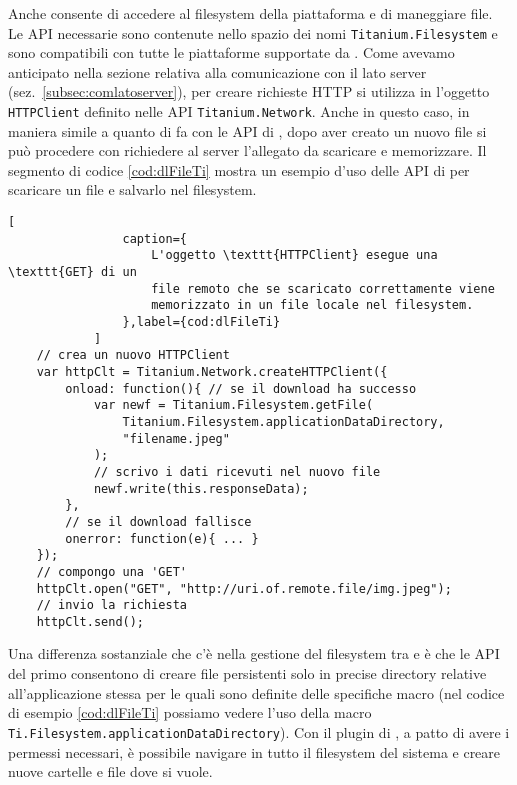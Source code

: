             Anche \tisdk{} consente di accedere al filesystem della piattaforma
            e di maneggiare file. Le API necessarie sono contenute nello
            spazio dei nomi \texttt{Titanium.Filesystem} e sono compatibili
            con tutte le piattaforme supportate da \tisdk{}. Come avevamo
            anticipato nella sezione relativa alla comunicazione con il lato
            server (sez.~\ref{subsec:comlatoserver}), per creare richieste HTTP
            si utilizza in \tisdk{} l'oggetto \texttt{HTTPClient} definito nelle
            API \texttt{Titanium.Network}. Anche in questo caso, in maniera
            simile a quanto di fa con le API di \pg{}, dopo aver creato un nuovo
            file si può procedere con richiedere al server l'allegato da
            scaricare e memorizzare. Il segmento di codice \ref{cod:dlFileTi}
            mostra un esempio d'uso delle API di \tisdk{} per scaricare un file
            e salvarlo nel filesystem.
            \begin{lstlisting}[
                caption={
                    L'oggetto \texttt{HTTPClient} esegue una \texttt{GET} di un
                    file remoto che se scaricato correttamente viene
                    memorizzato in un file locale nel filesystem.
                },label={cod:dlFileTi}
            ]
    // crea un nuovo HTTPClient
    var httpClt = Titanium.Network.createHTTPClient({
        onload: function(){ // se il download ha successo
            var newf = Titanium.Filesystem.getFile(
                Titanium.Filesystem.applicationDataDirectory,
                "filename.jpeg"
            );
            // scrivo i dati ricevuti nel nuovo file
            newf.write(this.responseData);
        },
        // se il download fallisce
        onerror: function(e){ ... }
    });
    // compongo una 'GET'
    httpClt.open("GET", "http://uri.of.remote.file/img.jpeg");
    // invio la richiesta
    httpClt.send();
            \end{lstlisting}
            Una differenza sostanziale che c'è nella gestione del filesystem
            tra \tisdk{} e \pg{} è che le API del primo consentono di creare
            file persistenti solo in precise directory relative
            all'applicazione stessa per le quali sono definite delle specifiche
            macro (nel codice di esempio \ref{cod:dlFileTi} possiamo vedere
            l'uso della macro \texttt{Ti.Filesystem.applicationDataDirectory}).
            Con il plugin di \pg{}, a patto di avere i permessi necessari, è
            possibile navigare in tutto il filesystem del sistema e creare nuove
            cartelle e file dove si vuole.



